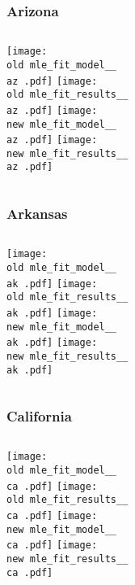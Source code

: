 \documentclass{beamer}
\newcommand{\old}{current_two_stage_output/pyseir/state_summaries/reports/}
\newcommand{\new}{new_shortest_t_delta/pyseir/state_summaries/reports/}
\newcommand{\az}{Arizona__04}
\newcommand{\ak}{Arkansas__05}
\newcommand{\ca}{California__06}
\begin{document}
\begin{frame}
\frametitle{Arizona}
    \begin{columns}[t]

       \texttt{[image: \\old mle\_fit\_model\_\_\\az .pdf]}
       \texttt{[image: \\old mle\_fit\_results\_\_\\az .pdf]}   
       \texttt{[image: \\new mle\_fit\_model\_\_\\az .pdf]}
       \texttt{[image: \\new mle\_fit\_results\_\_\\az .pdf]}   
       
\end{columns}
\end{frame}

\begin{frame}
\frametitle{Arkansas}
    \begin{columns}[t]

       \texttt{[image: \\old mle\_fit\_model\_\_\\ak .pdf]}
       \texttt{[image: \\old mle\_fit\_results\_\_\\ak .pdf]}   
       \texttt{[image: \\new mle\_fit\_model\_\_\\ak .pdf]}
       \texttt{[image: \\new mle\_fit\_results\_\_\\ak .pdf]}   
       
\end{columns}
\end{frame}

\begin{frame}
\frametitle{California}
    \begin{columns}[t]

       \texttt{[image: \\old mle\_fit\_model\_\_\\ca .pdf]}
       \texttt{[image: \\old mle\_fit\_results\_\_\\ca .pdf]}   
       \texttt{[image: \\new mle\_fit\_model\_\_\\ca .pdf]}
       \texttt{[image: \\new mle\_fit\_results\_\_\\ca .pdf]}   
       
\end{columns}
\end{frame}
\end{document}
